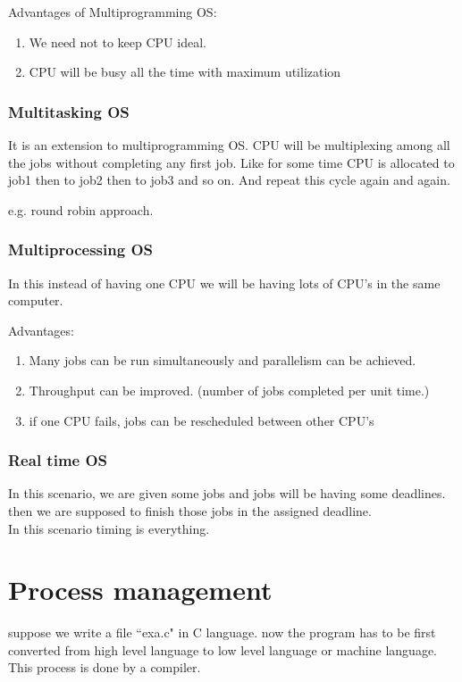 \documentclass[12pt,letterpaper]{article}
\begin{document}
Advantages of Multiprogramming OS:
\begin{enumerate}
  \item We need not to keep CPU ideal. 
  \item CPU will be busy all the time with maximum utilization
\end{enumerate}

\subsubsection{Multitasking OS}
It is an extension to multiprogramming OS. CPU will be multiplexing among all the jobs without completing any first job. 
Like for some time CPU is allocated to job1 then to job2 then to job3 and so on. And repeat this cycle again and again. 

e.g. round robin approach. 

\subsubsection{Multiprocessing OS}
In this instead of having one CPU we will be having lots of CPU's in the same computer. 

Advantages:
\begin{enumerate}
  \item Many jobs can be run simultaneously and parallelism can be achieved.
  \item Throughput can be improved. (number of jobs completed per unit time.)
  \item if one CPU fails, jobs can be rescheduled between other CPU's
\end{enumerate}

\subsubsection{Real time OS}
In this scenario, we are given some jobs and jobs will be having some deadlines. then we are supposed to finish those jobs in the assigned deadline. \\ 
In this scenario timing is everything. 

\section{Process management}
suppose we write a file ``exa.c" in C language. 
now the program has to be first converted from high level language to  low level language or machine language. This process is done by a compiler. 
\end{document}
